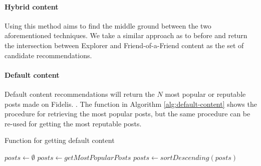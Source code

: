 \paragraph{Hybrid content} Using this method aims to find the middle ground between the two aforementioned techniques. We take a similar approach as to before and return the intersection between Explorer and Friend-of-a-Friend content as the set of candidate recommendations.

\paragraph{Default content} Default content recommendations will return the $N$ most popular or reputable posts made on Fidelis. . The function in Algorithm \ref{alg:default-content} shows the procedure for retrieving the most popular posts, but the same procedure can be re-used for getting the most reputable posts.

\begin{algorithm}[H]
\caption{Function for getting default content}
\label{alg:default-content}
\begin{algorithmic}[1]
	\State $posts\gets \emptyset$
	\State $posts\gets getMostPopularPosts$
	\State $posts\gets sortDescending(posts)$
	\State {}
\EndFunction
\end{algorithmic}
\end{algorithm}